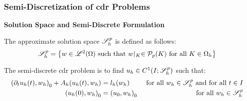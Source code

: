 \begin{frame}
    \frametitle{Semi-Discretization of \acrshort{cdr} Problems}

    \vspace*{\fill}
    \begin{center}
        {\color{\accentcolor} \Large \textbf{Solution Space and Semi-Discrete Formulation}}
        \vspace*{0.25cm}

        \begin{minipage}{0.75\textwidth}
            \begin{definition}
                The approximate solution space $\mathscr{S}_h^p$ is defined as follows:
                \begin{align*}
                    \mathscr{S}_h^p = \left\{ w \in \mathscr{L}^{2}(\Omega) \text{ such that } w \!\!\restriction_{K} \in \mathcal{P}_{p}(K) \text{ for all } K \in \Omega_h \right\}
                \end{align*}
            \end{definition}
        \end{minipage}
    \end{center}

    \vspace*{\fill}

    \begin{center}
        \begin{minipage}{0.75\textwidth}
            \begin{definition}
                The semi-discrete \acrshort{cdr} problem is to find $u_h \in C^1(I; \mathscr{S}_h^p)$ such that:
                \begin{align*}
                    \left( \partial_t u_h(t), w_h \right)_0 + A_h(u_h(t), w_h) &= l_h(w_h) &\text{ for all } w_h \in \mathscr{S}_h^p \text{ and for all } t \in I \\
                    \left( u_h(0), w_h \right)_0 &= \left( u_0, w_h \right)_0 &\text{ for all } w_h \in \mathscr{S}_h^p
                \end{align*}
            \end{definition}
        \end{minipage}
    \end{center}
    \vspace*{\fill}
    
\end{frame}

